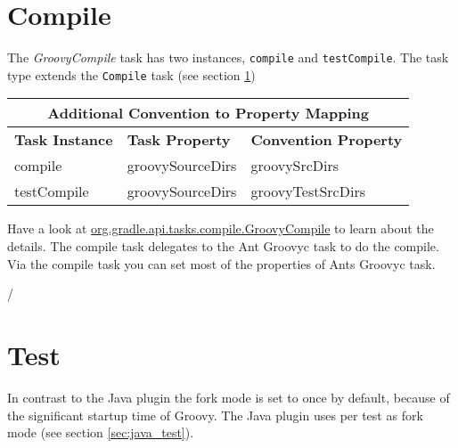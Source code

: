 \section{Compile} %
\label{sec:compile}
The \emph{GroovyCompile} task has two instances, \texttt{compile} and \texttt{testCompile}. The task type extends the \texttt{Compile} task (see section \ref{sec:compile})
\begin{center}
	\begin{tabular}{|l|l|l|} \hline
		\multicolumn{3}{|c|}{Additional Convention to Property Mapping} \\ \hline
		\textbf{Task Instance} & \textbf{Task Property} & \textbf{Convention Property} \\ \hline
		compile & groovySourceDirs & groovySrcDirs \\ \hline
		testCompile & groovySourceDirs & groovyTestSrcDirs \\ \hline
	\end{tabular} 
\end{center}
Have a look at \href{\API tasks/compile/GroovyCompile.html}{org.gradle.api.tasks.compile.GroovyCompile} to learn about the details. The compile task delegates to the Ant Groovyc task to do the compile. Via the compile task you can set most of the properties of Ants Groovyc task. 

/\section{Test} %
\label{sec:test}
In contrast to the Java plugin the fork mode is set to once by default, because of the significant startup time of Groovy. The Java plugin uses per test as fork mode (see section \ref{sec:java_test}). 

